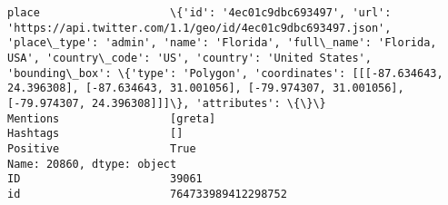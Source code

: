 \documentclass[11pt]{article}
\begin{document}
\begin{Verbatim}[commandchars=\\\{\}]
place                    \{'id': '4ec01c9dbc693497', 'url': 'https://api.twitter.com/1.1/geo/id/4ec01c9dbc693497.json', 'place\_type': 'admin', 'name': 'Florida', 'full\_name': 'Florida, USA', 'country\_code': 'US', 'country': 'United States', 'bounding\_box': \{'type': 'Polygon', 'coordinates': [[[-87.634643, 24.396308], [-87.634643, 31.001056], [-79.974307, 31.001056], [-79.974307, 24.396308]]]\}, 'attributes': \{\}\}                                   
Mentions                 [greta]                                                                                                                                                                                                                                                                                                                                                                                                                                
Hashtags                 []                                                                                                                                                                                                                                                                                                                                                                                                                                     
Positive                 True                                                                                                                                                                                                                                                                                                                                                                                                                                   
Name: 20860, dtype: object
ID                       39061                                                                                                                                                                                                                                                                                                                                                                                                                                                                                                                                                                  
id                       764733989412298752                                                                                                                                                                                                                                                                                                                                                                                                                                                                                                                                                     

\end{Verbatim}
\end{document}
